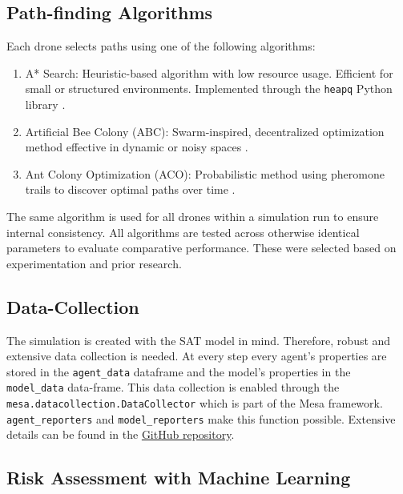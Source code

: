 \documentclass[11pt, a4paper]{article}
\begin{document}
\subsection{Path-finding Algorithms}
Each drone selects paths using one of the following algorithms:
\begin{enumerate}
    \item A* Search: Heuristic-based algorithm with low resource usage. Efficient for small or structured environments. Implemented through the \texttt{heapq} Python library \citep{python-heapq}.
    \item Artificial Bee Colony (ABC): Swarm-inspired, decentralized optimization method effective in dynamic or noisy spaces \citep{karaboga2007abc}.
    \item Ant Colony Optimization (ACO): Probabilistic method using pheromone trails to discover optimal paths over time \citep{ACO}.
\end{enumerate}

The same algorithm is used for all drones within a simulation run to ensure internal consistency. All algorithms are tested across otherwise identical parameters to evaluate comparative performance. These were selected based on experimentation and prior research.

\subsection{Data-Collection}

The simulation is created with the SAT model in mind. Therefore, robust and extensive data collection is needed. At every step every agent's properties are stored in the \texttt{agent\_data} dataframe and the model's properties in the \texttt{model\_data} data-frame. This data collection is enabled through the \texttt{mesa.datacollection.DataCollector{}} which is part of the Mesa framework. \texttt{agent\_reporters} and \texttt{model\_reporters} make this function possible. Extensive details can be found in the \href{https://github.com/kaispeidel/Autonomous-Drone-Firefighting-Simulation}{GitHub repository}.

\subsection{Risk Assessment with Machine Learning}
\label{Risk Assessment with Machine Learning}
\end{document}
